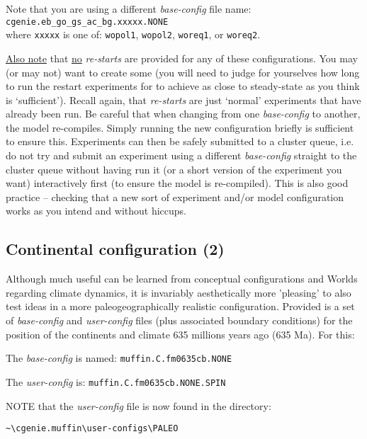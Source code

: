 \documentclass[11pt,fleqn]{book} %
\begin{document}
Note that you are using a different \textit{base-config} file name: \small\texttt{cgenie.eb\_go\_gs\_ac\_bg.xxxxx.NONE}\normalsize \\where \texttt{xxxxx} is one of: \texttt{wopol1}, \texttt{wopol2}, \texttt{woreq1}, or \texttt{woreq2}. 

\uline{Also note} that \uline{no} \textit{re-starts} are provided for any of these configurations. You may (or may not) want to create some (you will need to judge for yourselves how long to run the restart experiments for to achieve as close to steady-state as you think is ‘sufficient’). Recall again, that \textit{re-starts} are just ‘normal’ experiments that have already been run.
Be careful that when changing from one \textit{base-config} to another, the model re-compiles. Simply running the new configuration briefly is sufficient to ensure this. Experiments can then be safely submitted to a cluster queue, i.e. do not try and submit an experiment using a different \textit{base-config} straight to the cluster queue without having run it (or a short version of the experiment you want) interactively first (to ensure the model is re-compiled). This is also good practice – checking that a new sort of experiment and/or model configuration works as you intend and without hiccups.


\subsection{Continental configuration (2)}

Although much useful can be learned from conceptual configurations and Worlds regarding climate dynamics, it is invariably aesthetically more 'pleasing' to also test ideas in a more paleogeographically realistic configuration. Provided is a set of \textit{base-config} and \textit{user-config} files (plus associated boundary conditions) for the position of the continents and climate 635 millions years ago (635 Ma). For this:

The \textit{base-config} is named: \texttt{muffin.C.fm0635cb.NONE}

The \textit{user-config} is: \texttt{muffin.C.fm0635cb.NONE.SPIN}

NOTE that the \textit{user-config} file is now found in the directory:

\vspace{-2mm}
\begin{verbatim}
~\cgenie.muffin\user-configs\PALEO
\end{verbatim}
\vspace{-2mm}
\end{document}
